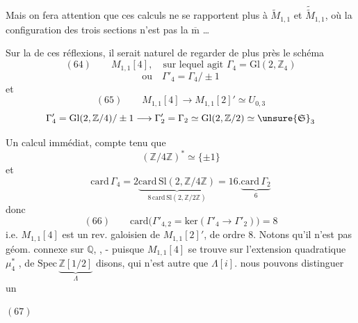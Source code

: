 Mais on fera attention que ces calculs
ne se rapportent plus à $\widetilde M_{1,1}$ et
$\widetilde{\widetilde M}_{1,1}$,
où la configuration des trois sections
n'est pas la $\overline{\mathrm m}$ \ldots


Sur la  de ces réflexions, il serait naturel de regarder
de plus près le schéma
\[
(64)\qquad
M_{1,1}[4],\quad
\text{sur lequel agit }\Gamma_4=\mathrm{Gl}(2,\mathbb Z_4)
\]
\[
\text{ou}\quad \Gamma'_4=\Gamma_4/\pm1
\]
et  
\[
(65)\qquad
M_{1,1}[4]\longrightarrow M_{1,1}[2]'\simeq U_{0,3}
\]
\[
\Gamma'_4=\mathrm{Gl}(2,\mathbb Z/4)/\pm1
\longrightarrow
\Gamma'_2=\Gamma_2\simeq\mathrm{Gl}(2,\mathbb Z/2)
\simeq\unsure{\mathfrak S}_3
\]

Un calcul immédiat, compte tenu que
\[
(\mathbb Z/4\mathbb Z)^*\simeq\{\pm1\}
\]
et 
\[
\mathrm{card}\,\Gamma_4
=
2\underbrace{\mathrm{card}\,\mathrm{Sl}(2,\mathbb Z/4\mathbb Z)}
_{8\,\mathrm{card}\,\mathrm{Sl}(2,\mathbb Z/2\mathbb Z)}
=
16.\underbrace{\mathrm{card}\,\Gamma_2}_{6}
\]
donc
\[
(66)\qquad
\mathrm{card}\bigl(\Gamma'_{4,2}
=\mathrm{ker}(\Gamma'_4\longrightarrow\Gamma'_2)\bigr)=8
\]
i.e. $M_{1,1}[4]$ est un rev. galoisien de $M_{1,1}[2]'$,
de  ordre $8$.
Notons qu'il n'est pas géom. connexe sur $\mathbb Q$,
,
- puisque $M_{1,1}[4]$ se trouve sur l'extension quadratique
$\mu_4^*$ , de
$\mathrm{Spec}\,\underbrace{\mathbb Z[1/2]}_{\Lambda}$ disons,
qui n'est autre que $\Lambda[i]$.
nous pouvons distinguer un 


\((67)\)

